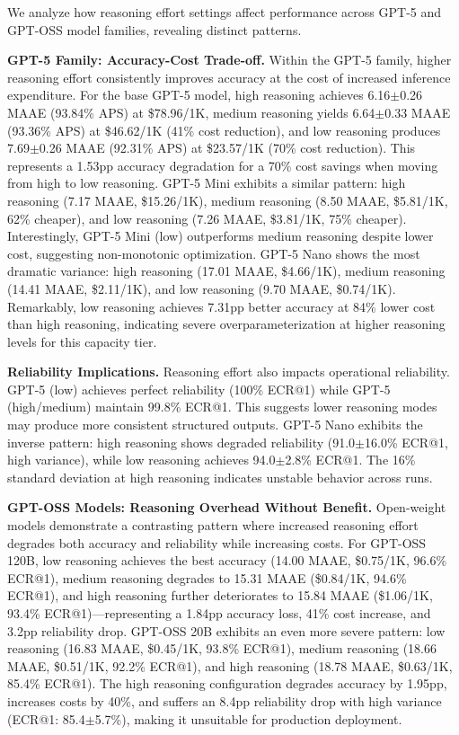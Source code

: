 \documentclass[letterpaper]{article} %
\begin{document}
We analyze how reasoning effort settings affect performance across GPT-5 and GPT-OSS model families, revealing distinct patterns.

\textbf{GPT-5 Family: Accuracy-Cost Trade-off.} Within the GPT-5 family, higher reasoning effort consistently improves accuracy at the cost of increased inference expenditure. For the base GPT-5 model, high reasoning achieves 6.16$\pm$0.26 MAAE (93.84\% APS) at \$78.96/1K, medium reasoning yields 6.64$\pm$0.33 MAAE (93.36\% APS) at \$46.62/1K (41\% cost reduction), and low reasoning produces 7.69$\pm$0.26 MAAE (92.31\% APS) at \$23.57/1K (70\% cost reduction). This represents a 1.53pp accuracy degradation for a 70\% cost savings when moving from high to low reasoning. GPT-5 Mini exhibits a similar pattern: high reasoning (7.17 MAAE, \$15.26/1K), medium reasoning (8.50 MAAE, \$5.81/1K, 62\% cheaper), and low reasoning (7.26 MAAE, \$3.81/1K, 75\% cheaper). Interestingly, GPT-5 Mini (low) outperforms medium reasoning despite lower cost, suggesting non-monotonic optimization. GPT-5 Nano shows the most dramatic variance: high reasoning (17.01 MAAE, \$4.66/1K), medium reasoning (14.41 MAAE, \$2.11/1K), and low reasoning (9.70 MAAE, \$0.74/1K). Remarkably, low reasoning achieves 7.31pp better accuracy at 84\% lower cost than high reasoning, indicating severe overparameterization at higher reasoning levels for this capacity tier.

\textbf{Reliability Implications.} Reasoning effort also impacts operational reliability. GPT-5 (low) achieves perfect reliability (100\% ECR@1) while GPT-5 (high/medium) maintain 99.8\% ECR@1. This suggests lower reasoning modes may produce more consistent structured outputs. GPT-5 Nano exhibits the inverse pattern: high reasoning shows degraded reliability (91.0$\pm$16.0\% ECR@1, high variance), while low reasoning achieves 94.0$\pm$2.8\% ECR@1. The 16\% standard deviation at high reasoning indicates unstable behavior across runs.

\textbf{GPT-OSS Models: Reasoning Overhead Without Benefit.} Open-weight models demonstrate a contrasting pattern where increased reasoning effort degrades both accuracy and reliability while increasing costs. For GPT-OSS 120B, low reasoning achieves the best accuracy (14.00 MAAE, \$0.75/1K, 96.6\% ECR@1), medium reasoning degrades to 15.31 MAAE (\$0.84/1K, 94.6\% ECR@1), and high reasoning further deteriorates to 15.84 MAAE (\$1.06/1K, 93.4\% ECR@1)---representing a 1.84pp accuracy loss, 41\% cost increase, and 3.2pp reliability drop. GPT-OSS 20B exhibits an even more severe pattern: low reasoning (16.83 MAAE, \$0.45/1K, 93.8\% ECR@1), medium reasoning (18.66 MAAE, \$0.51/1K, 92.2\% ECR@1), and high reasoning (18.78 MAAE, \$0.63/1K, 85.4\% ECR@1). The high reasoning configuration degrades accuracy by 1.95pp, increases costs by 40\%, and suffers an 8.4pp reliability drop with high variance (ECR@1: 85.4$\pm$5.7\%), making it unsuitable for production deployment.
\end{document}
